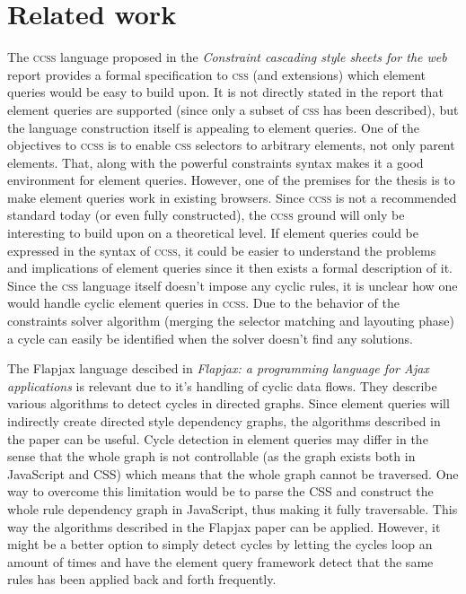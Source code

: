 \documentclass[oneside,a4paper,11pt]{kth-mag}
\begin{document}
\section{Related work}
The \textsc{ccss} language proposed in the \emph{Constraint cascading style sheets for the web} report provides a formal specification to \textsc{css} (and extensions) which element queries would be easy to build upon.
It is not directly stated in the report that element queries are supported (since only a subset of \textsc{css} has been described), but the language construction itself is appealing to element queries.
One of the objectives to \textsc{ccss} is to enable \textsc{css} selectors to arbitrary elements, not only parent elements.
That, along with the powerful constraints syntax makes it a good environment for element queries.
However, one of the premises for the thesis is to make element queries work in existing browsers.
Since \textsc{ccss} is not a recommended standard today (or even fully constructed), the \textsc{ccss} ground will only be interesting to build upon on a theoretical level.
If element queries could be expressed in the syntax of \textsc{ccss}, it could be easier to understand the problems and implications of element queries since it then exists a formal description of it.
Since the \textsc{css} language itself doesn't impose any cyclic rules, it is unclear how one would handle cyclic element queries in \textsc{ccss}.
Due to the behavior of the constraints solver algorithm (merging the selector matching and layouting phase) a cycle can easily be identified when the solver doesn't find any solutions.

The Flapjax language descibed in \emph{Flapjax: a programming language for Ajax applications} is relevant due to it's handling of cyclic data flows.
They describe various algorithms to detect cycles in directed graphs.
Since element queries will indirectly create directed style dependency graphs, the algorithms described in the paper can be useful.
Cycle detection in element queries may differ in the sense that the whole graph is not controllable (as the graph exists both in JavaScript and CSS) which means that the whole graph cannot be traversed.
One way to overcome this limitation would be to parse the CSS and construct the whole rule dependency graph in JavaScript, thus making it fully traversable.
This way the algorithms described in the Flapjax paper can be applied.
However, it might be a better option to simply detect cycles by letting the cycles loop an amount of times and have the element query framework detect that the same rules has been applied back and forth frequently.
\end{document}
